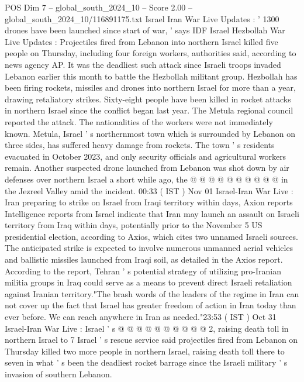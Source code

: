 \begin{textsample}{POS Dim 7 – global\_south\_2024\_10 – Score 2.00 – global\_south\_2024\_10/116891175.txt}  \label{ex:f7_pos_203}
Israel Iran War Live Updates : ' 1300 drones have been launched since start of war, ' says IDF Israel Hezbollah War Live Updates : Projectiles fired from Lebanon into northern Israel killed five people on Thursday, including four foreign workers, authorities said, according to news agency AP.
It was the deadliest such attack since Israeli troops invaded Lebanon earlier this month to battle the Hezbollah militant group.
Hezbollah has been firing rockets, missiles and drones into northern Israel for more than a year, drawing retaliatory strikes.
Sixty-eight people have been killed in rocket attacks in northern Israel since the conflict began last year.
The Metula regional council reported the attack.
The nationalities of the workers were not immediately known.
Metula, Israel ' s northernmost town which is surrounded by Lebanon on three sides, has suffered heavy damage from rockets.
The town ' s residents evacuated in October 2023, and only security officials and agricultural workers remain.
Another suspected drone launched from Lebanon was shot down by air defenses over northern Israel a short while ago, the @ @ @ @ @ @ @ @ @ @ in the Jezreel Valley amid the incident. 00:33 ( IST ) Nov 01 Israel-Iran War Live : Iran preparing to strike on Israel from Iraqi territory within days, Axion reports Intelligence reports from Israel indicate that Iran may launch an assault on Israeli territory from Iraq within days, potentially prior to the November 5 US presidential election, according to Axios, which cites two unnamed Israeli sources.
The anticipated strike is expected to involve numerous unmanned aerial vehicles and ballistic missiles launched from Iraqi soil, as detailed in the Axios report.
According to the report, Tehran ' s potential strategy of utilizing pro-Iranian militia groups in Iraq could serve as a means to prevent direct Israeli retaliation against Iranian territory."The brash words of the leaders of the regime in Iran can not cover up the fact that Israel has greater freedom of action in Iran today than ever before.
We can reach anywhere in Iran as needed."23:53 ( IST ) Oct 31 Israel-Iran War Live : Israel ' s @ @ @ @ @ @ @ @ @ @ 2, raising death toll in northern Israel to 7 Israel ' s rescue service said projectiles fired from Lebanon on Thursday killed two more people in northern Israel, raising death toll there to seven in what ' s been the deadliest rocket barrage since the Israeli military ' s invasion of southern Lebanon.

\end{textsample}
